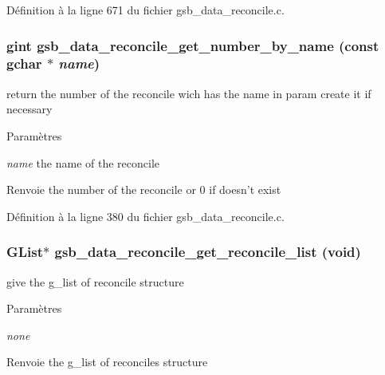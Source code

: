 Définition à la ligne 671 du fichier gsb\_\-data\_\-reconcile.c.

\subsubsection[{gsb\_\-data\_\-reconcile\_\-get\_\-number\_\-by\_\-name}]{\setlength{\rightskip}{0pt plus 5cm}gint gsb\_\-data\_\-reconcile\_\-get\_\-number\_\-by\_\-name (const gchar $\ast$ {\em name})}\label{gsb__data__reconcile_8c_a839ed7c90982127f0994a6472ba2f8bf}
return the number of the reconcile wich has the name in param create it if necessary


\begin{DoxyParams}{Paramètres}
\item[{\em name}]the name of the reconcile\end{DoxyParams}
\begin{DoxyReturn}{Renvoie}
the number of the reconcile or 0 if doesn't exist 
\end{DoxyReturn}


Définition à la ligne 380 du fichier gsb\_\-data\_\-reconcile.c.

\subsubsection[{gsb\_\-data\_\-reconcile\_\-get\_\-reconcile\_\-list}]{\setlength{\rightskip}{0pt plus 5cm}GList$\ast$ gsb\_\-data\_\-reconcile\_\-get\_\-reconcile\_\-list (void)}\label{gsb__data__reconcile_8c_aa78fc612a3b6c450f074b879633c6db3}
give the g\_\-list of reconcile structure


\begin{DoxyParams}{Paramètres}
\item[{\em none}]\end{DoxyParams}
\begin{DoxyReturn}{Renvoie}
the g\_\-list of reconciles structure 
\end{DoxyReturn}


